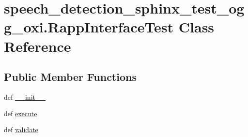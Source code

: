 \hypertarget{classspeech__detection__sphinx__test__ogg__oxi_1_1RappInterfaceTest}{\section{speech\-\_\-detection\-\_\-sphinx\-\_\-test\-\_\-ogg\-\_\-oxi.\-Rapp\-Interface\-Test Class Reference}
\label{classspeech__detection__sphinx__test__ogg__oxi_1_1RappInterfaceTest}
}
\subsection*{Public Member Functions}
\begin{DoxyCompactItemize}
\item 
def \hyperlink{classspeech__detection__sphinx__test__ogg__oxi_1_1RappInterfaceTest_ac1e89231e425a58494deed6c7df9e7d8}{\-\_\-\-\_\-init\-\_\-\-\_\-}
\item 
def \hyperlink{classspeech__detection__sphinx__test__ogg__oxi_1_1RappInterfaceTest_a9f25966387a0836d65c41759d903b3c8}{execute}
\item 
def \hyperlink{classspeech__detection__sphinx__test__ogg__oxi_1_1RappInterfaceTest_abbe2b37e518aee7b642ab283cb87cc9b}{validate}
\end{DoxyCompactItemize}
